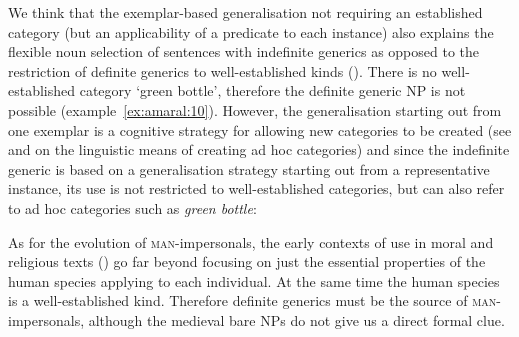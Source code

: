 \documentclass[output=paper]{langscibook}
\begin{document}
\z 


We think that the exemplar-based generalisation not requiring an established category (but an applicability of a predicate to each instance) also explains the flexible noun selection of sentences with indefinite generics as opposed to the restriction of definite generics to well-established kinds (\citealt{KrifkaGerstner-Link1993}). There is no well-established category ‘green bottle’, therefore the definite generic NP is not possible (example~\ref{ex:amaral:10}). However, the generalisation starting out from one exemplar is a cognitive strategy for allowing new categories to be created (see \citealt{Barsalou1983} and \citealt{Mauri2017} on the linguistic means of creating ad hoc categories) and since the indefinite generic is based on a generalisation strategy starting out from a representative instance, its use is not restricted to well-established categories, but can also refer to ad hoc categories such as \textit{green bottle}:

\z 


{As for the evolution of} {\textsc{man}}{{}-impersonals, the early contexts of use in moral and religious texts (\citealt{GiacaloneRamatSansò2007}) go far beyond focusing on just the essential properties of the human species applying to each individual. At the same time the human species is a well-established kind. Therefore definite generics must be the source of} {\textsc{man}}-impersonals, although the medieval bare NPs do not give us a direct formal clue.
\end{document}
